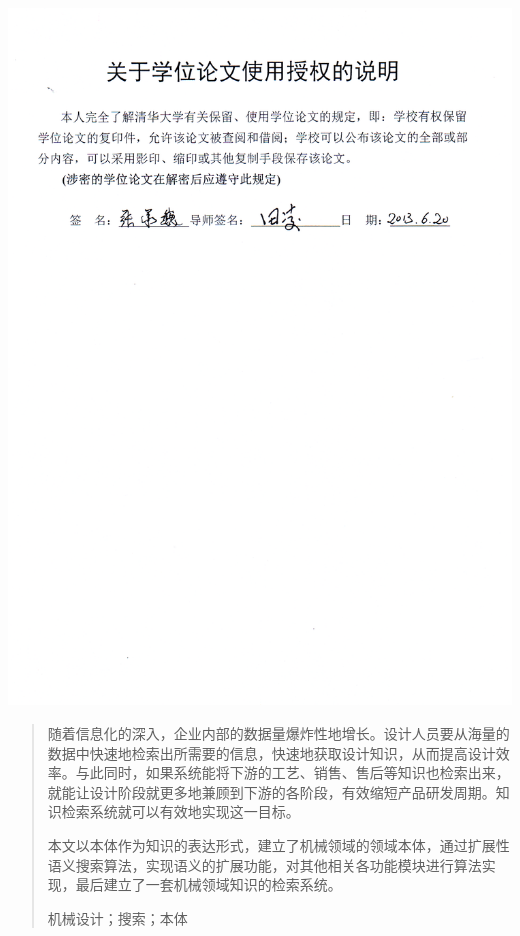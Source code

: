 \documentclass[12pt,a4paper]{article}
\newcommand{\xiaosanhao}{\fontsize{15pt}{\baselineskip}\selectfont}
\newcommand{\xiaosihao}{\fontsize{12pt}{\baselineskip}\selectfont}
\begin{document}
\begin{titlepage}
	\centering\includegraphics[width=6in]{authorization.png} 
	\thispagestyle{empty}






\end{titlepage}






\renewcommand\abstractname{\xiaosanhao 中文摘要}
\phantom{Start!}

\vspace{1cm} 
\begin{abstract}

\setlength{\baselineskip}{20pt} %
\noindent
\xiaosihao
\quad \quad 随着信息化的深入，企业内部的数据量爆炸性地增长。设计人员要从海量的数据中快速地检索出所需要的信息，快速地获取设计知识，从而提高设计效率。与此同时，如果系统能将下游的工艺、销售、售后等知识也检索出来，就能让设计阶段就更多地兼顾到下游的各阶段，有效缩短产品研发周期。知识检索系统就可以有效地实现这一目标。

\noindent
\quad \quad 本文以本体作为知识的表达形式，建立了机械领域的领域本体，通过扩展性语义搜索算法，实现语义的扩展功能，对其他相关各功能模块进行算法实现，最后建立了一套机械领域知识的检索系统。

\vspace{13pt} 

\noindent
\quad \quad 
  \SimSun
 机械设计；搜索；本体
\end{abstract}
\end{document}
